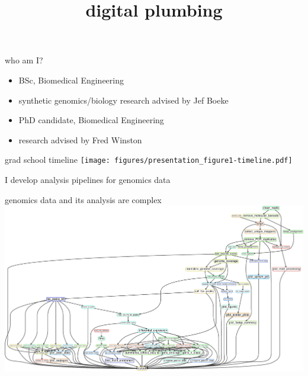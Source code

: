 \documentclass[aspectratio=169]{beamer}
\title{digital plumbing}
\begin{document}
\begin{frame}
    \titlepage
\end{frame}

\begin{frame}{who am I?}
    \begin{description}[align=right]
        \setlength{\itemsep}{1cm}
        \item[undergrad:]
            \begin{itemize}
                \item BSc, Biomedical Engineering
                \item synthetic genomics/biology research advised by Jef Boeke
            \end{itemize}
        \item[currently:]
            \begin{itemize}
                \item PhD candidate, Biomedical Engineering
                \item research advised by Fred Winston
            \end{itemize}
    \end{description}
\end{frame}

\begin{frame}{grad school timeline}
\texttt{[image: figures/presentation\_figure1-timeline.pdf]}
\end{frame}

\begin{frame}{I develop analysis pipelines for genomics data}
\end{frame}

\begin{frame}{genomics data and its analysis are complex}
\includegraphics[width=\textwidth]{figures/rulegraph.pdf}
\end{frame}
\end{document}

